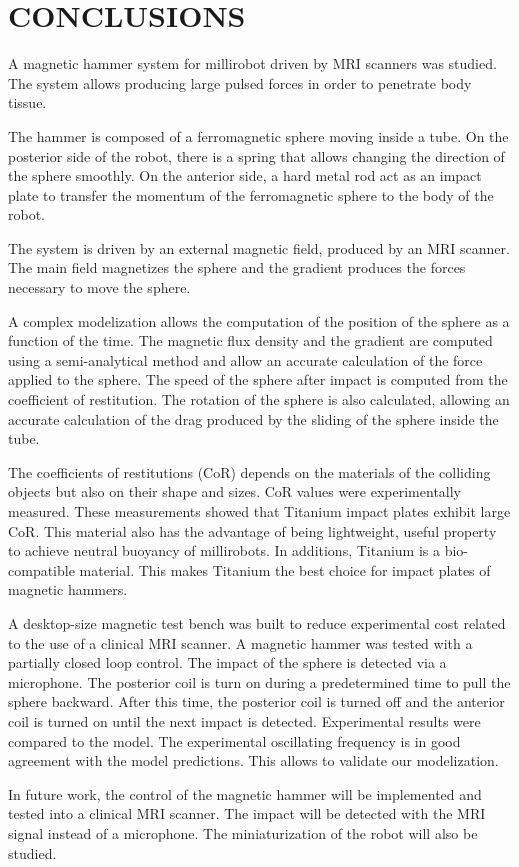 \documentclass[letterpaper, 10 pt, conference]{ieeeconf}  %
\begin{document}
\section{CONCLUSIONS}
\label{conclusion}
A magnetic hammer system for millirobot driven by MRI scanners was studied. The system allows producing large pulsed forces in order to penetrate body tissue.\par
The hammer is composed of a ferromagnetic sphere moving inside a tube. On the posterior side of the robot, there is a spring that allows changing the direction of the sphere smoothly. On the anterior side, a hard metal rod act as an impact plate to transfer the momentum of the ferromagnetic sphere to the body of the robot.\par
The system is driven by an external magnetic field, produced by an MRI scanner. The main field magnetizes the sphere and the gradient produces the forces necessary to move the sphere.\par
 A complex modelization allows the computation of the position of the sphere as a function of the time. The magnetic flux density and the gradient are computed using a semi-analytical method and allow an accurate calculation of the force applied to the sphere. The speed of the sphere after impact is computed from the coefficient of restitution. The rotation of the sphere is also calculated, allowing an accurate calculation of the drag produced by the sliding of the sphere inside the tube.\par
The coefficients of restitutions (CoR) depends on the materials of the colliding objects but also on their shape and sizes. CoR values were experimentally measured. These measurements showed that Titanium impact plates exhibit large CoR. This material also has the advantage of being lightweight, useful property to achieve neutral buoyancy of millirobots. In additions, Titanium is a bio-compatible material. This makes Titanium the best choice for impact plates of magnetic hammers.\par
A desktop-size magnetic test bench was built to reduce experimental cost related to the use of a clinical MRI scanner. A magnetic hammer was tested with a partially closed loop control. The impact of the sphere is detected via a microphone. The posterior coil is turn on during a predetermined time to pull the sphere backward. After this time, the posterior coil is turned off and the anterior coil is turned on until the next impact is detected. Experimental results were compared to the model. The experimental oscillating frequency is in good agreement with the model predictions. This allows to validate our modelization.\par
In future work, the control of the magnetic hammer will be implemented and tested into a clinical MRI scanner. The impact will be detected with the MRI signal instead of a microphone. The miniaturization of the robot will also be studied.
\end{document}
